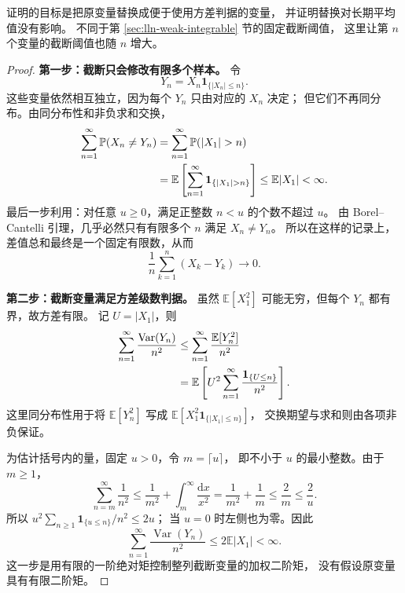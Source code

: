 \documentclass[UTF8,12pt,a4paper,fontset=fandol]{ctexart}
\begin{document}
证明的目标是把原变量替换成便于使用方差判据的变量，
并证明替换对长期平均值没有影响。
不同于第 \ref{sec:lln-weak-integrable} 节的固定截断阈值，
这里让第 $n$ 个变量的截断阈值也随 $n$ 增大。

\begin{proof}
\textbf{第一步：截断只会修改有限多个样本。}
令
\[
  Y_n=X_n\mathbf1_{\{|X_n|\leq n\}}.
\]
这些变量依然相互独立，因为每个 $Y_n$ 只由对应的 $X_n$ 决定；
但它们不再同分布。由同分布性和非负求和交换，
\begin{align}
  \sum_{n=1}^\infty\mathbb P(X_n\neq Y_n)
  &=\sum_{n=1}^\infty\mathbb P(|X_1|>n) \notag\\
  &=\mathbb E\left[\sum_{n=1}^\infty
       \mathbf1_{\{|X_1|>n\}}\right]
  \leq\mathbb E|X_1|<\infty.
  \label{eq:lln-truncation-events}
\end{align}
最后一步利用：对任意 $u\geq0$，满足正整数 $n<u$ 的个数不超过 $u$。
由 Borel--Cantelli 引理，几乎必然只有有限多个 $n$ 满足 $X_n\neq Y_n$。
所以在这样的记录上，差值总和最终是一个固定有限数，从而
\begin{equation}
  \frac1n\sum_{k=1}^n(X_k-Y_k)\longrightarrow0.
  \label{eq:lln-truncation-difference}
\end{equation}

\textbf{第二步：截断变量满足方差级数判据。}
虽然 $\mathbb E[X_1^2]$ 可能无穷，但每个 $Y_n$ 都有界，故方差有限。
记 $U=|X_1|$，则
\begin{align}
  \sum_{n=1}^\infty\frac{\operatorname{Var}(Y_n)}{n^2}
  &\leq\sum_{n=1}^\infty\frac{\mathbb E[Y_n^2]}{n^2} \notag\\
  &=\mathbb E\left[
     U^2\sum_{n=1}^\infty\frac{\mathbf1_{\{U\leq n\}}}{n^2}
     \right].
  \label{eq:lln-truncated-variance}
\end{align}
这里同分布性用于将 $\mathbb E[Y_n^2]$ 写成
$\mathbb E[X_1^2\mathbf1_{\{|X_1|\leq n\}}]$，
交换期望与求和则由各项非负保证。

为估计括号内的量，固定 $u>0$，令 $m=\lceil u\rceil$，
即不小于 $u$ 的最小整数。由于 $m\geq1$，
\[
  \sum_{n=m}^\infty\frac1{n^2}
  \leq\frac1{m^2}+\int_m^\infty\frac{\mathrm dx}{x^2}
  =\frac1{m^2}+\frac1m
  \leq\frac2m
  \leq\frac2u.
\]
所以
$u^2\sum_{n\geq1}\mathbf1_{\{u\leq n\}}/n^2\leq2u$；
当 $u=0$ 时左侧也为零。因此
\begin{equation}
  \sum_{n=1}^\infty\frac{\operatorname{Var}(Y_n)}{n^2}
  \leq2\mathbb E|X_1|<\infty.
  \label{eq:lln-truncated-variance-finite}
\end{equation}
这一步是用有限的一阶绝对矩控制整列截断变量的加权二阶矩，
没有假设原变量具有有限二阶矩。


\end{proof}
\end{document}
